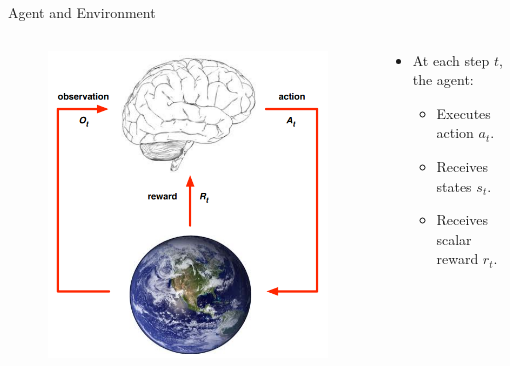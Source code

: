 \documentclass{beamer}
\begin{document}
\begin{frame}{Agent and Environment}
    \begin{columns}
        \begin{column}{0.5\textwidth}
            \begin{figure}
                \centering
                \includegraphics[width=\textwidth]{images/agent_env}
            \end{figure}        
        \end{column}
        
        \begin{column}{0.5\textwidth}
            \begin{itemize}
                \item At each step $t$, the agent:
                \begin{itemize}
                    \item Executes action $a_t$.
                    \item Receives states $s_t$.
                    \item Receives scalar reward $r_t$.\\~
                \end{itemize}
                

\end{itemize}
\end{column}
\end{columns}
\end{frame}
\end{document}
